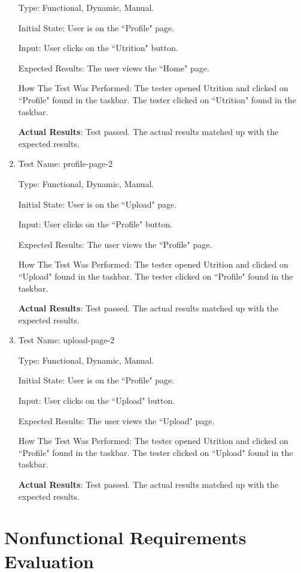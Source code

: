 \documentclass[12pt, titlepage]{article}
\begin{document}
\begin{enumerate}
		Type: Functional, Dynamic, Manual.
		
		Initial State: User is on the ``Profile" page.
		
		Input: User clicks on the ``Utrition" button.
		
		Expected Results: The user views the ``Home" page.
		
		How The Test Was Performed: The tester opened Utrition and clicked on ``Profile" found in the taskbar. The tester clicked on ``Utrition" found in the taskbar.
		
		\textbf{Actual Results}: Test passed. The actual results matched up with the expected results.
		
		\item{Test Name: profile-page-2}
		
		Type: Functional, Dynamic, Manual.
		
		Initial State: User is on the ``Upload" page.
		
		Input: User clicks on the ``Profile" button.
		
		Expected Results: The user views the ``Profile" page.
		
		How The Test Was Performed: The tester opened Utrition and clicked on ``Upload" found in the taskbar. The tester clicked on ``Profile" found in the taskbar.
		
		\textbf{Actual Results}: Test passed. The actual results matched up with the expected results.
		
		\item{Test Name: upload-page-2}
		
		Type: Functional, Dynamic, Manual.
		
		Initial State: User is on the ``Profile" page.
		
		Input: User clicks on the ``Upload" button.
		
		Expected Results: The user views the ``Upload" page.
		
		How The Test Was Performed: The tester opened Utrition and clicked on ``Profile" found in the taskbar. The tester clicked on ``Upload" found in the taskbar.
		
		\textbf{Actual Results}: Test passed. The actual results matched up with the expected results.
	\end{enumerate}

	\section{Nonfunctional Requirements Evaluation}
	
\end{document}
